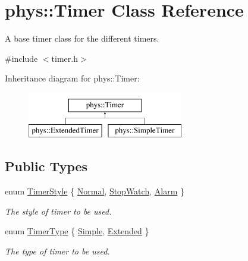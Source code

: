 \hypertarget{classphys_1_1Timer}{
\section{phys::Timer Class Reference}
\label{d3/d83/classphys_1_1Timer}
}


A base timer class for the different timers.  




{\ttfamily \#include $<$timer.h$>$}

Inheritance diagram for phys::Timer:\begin{figure}[H]
\begin{center}
\leavevmode
\includegraphics[height=2.000000cm]{d3/d83/classphys_1_1Timer}
\end{center}
\end{figure}
\subsection*{Public Types}
\begin{DoxyCompactItemize}
\item 
enum \hyperlink{classphys_1_1Timer_a1ee86bf43e20329d750c5d582dcce329}{TimerStyle} \{ \hyperlink{classphys_1_1Timer_a1ee86bf43e20329d750c5d582dcce329a5debd5b8437d14405bf25cd9b130449f}{Normal}, 
\hyperlink{classphys_1_1Timer_a1ee86bf43e20329d750c5d582dcce329a7599daa63100c2134df7d8b7c9b7f867}{StopWatch}, 
\hyperlink{classphys_1_1Timer_a1ee86bf43e20329d750c5d582dcce329ae9b9fa35767e4ac2c87c078e1d9a0729}{Alarm}
 \}
\begin{DoxyCompactList}\small\item\em The style of timer to be used. \item\end{DoxyCompactList}\item 
enum \hyperlink{classphys_1_1Timer_aacbbca9cc5543fc8414de59cd085c1c1}{TimerType} \{ \hyperlink{classphys_1_1Timer_aacbbca9cc5543fc8414de59cd085c1c1af8d1697e79f90f675fecc82e9aba7819}{Simple}, 
\hyperlink{classphys_1_1Timer_aacbbca9cc5543fc8414de59cd085c1c1aba207ea661f064c2041c73852c91efaa}{Extended}
 \}
\begin{DoxyCompactList}\small\item\em The type of timer to be used. \item\end{DoxyCompactList}\end{DoxyCompactItemize}
